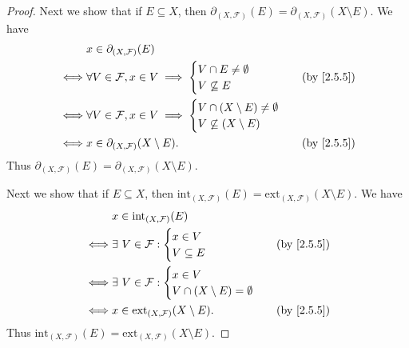\begin{proof}
  Next we show that if \(E \subseteq X\), then \(\partial_{(X, \mathcal{F})}(E) = \partial_{(X, \mathcal{F})}(X \setminus E)\).
  We have
  \begin{align*}
         & x \in \partial_{(X, \mathcal{F})}(E)                                                 \\
    \iff & \forall V \in \mathcal{F}, x \in V \implies \begin{cases}
                                                         V \cap E \neq \emptyset \\
                                                         V \not\subseteq E
                                                       \end{cases} & \text{(by \cref{2.5.5})}   \\
    \iff & \forall V \in \mathcal{F}, x \in V \implies \begin{cases}
                                                         V \cap (X \setminus E) \neq \emptyset \\
                                                         V \not\subseteq (X \setminus E)
                                                       \end{cases}    \\
    \iff & x \in \partial_{(X, \mathcal{F})}(X \setminus E).         & \text{(by \cref{2.5.5})}
  \end{align*}
  Thus \(\partial_{(X, \mathcal{F})}(E) = \partial_{(X, \mathcal{F})}(X \setminus E)\).

  Next we show that if \(E \subseteq X\), then \(\text{int}_{(X, \mathcal{F})}(E) = \text{ext}_{(X, \mathcal{F})}(X \setminus E)\).
  We have
  \begin{align*}
         & x \in \text{int}_{(X, \mathcal{F})}(E)                                         \\
    \iff & \exists\ V \in \mathcal{F} : \begin{cases}
                                          x \in V \\
                                          V \subseteq E
                                        \end{cases}          & \text{(by \cref{2.5.5})}   \\
    \iff & \exists\ V \in \mathcal{F} : \begin{cases}
                                          x \in V \\
                                          V \cap (X \setminus E) = \emptyset
                                        \end{cases}                 \\
    \iff & x \in \text{ext}_{(X, \mathcal{F})}(X \setminus E). & \text{(by \cref{2.5.5})}
  \end{align*}
  Thus \(\text{int}_{(X, \mathcal{F})}(E) = \text{ext}_{(X, \mathcal{F})}(X \setminus E)\).


\end{proof}
